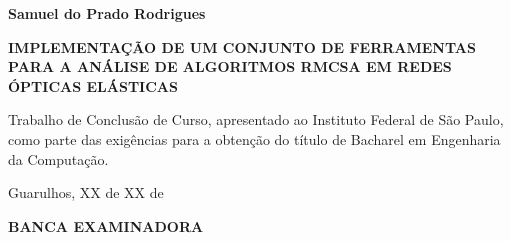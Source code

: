 \begin{center}

\textbf{Samuel do Prado Rodrigues}

\vfill

\textbf{\MakeUppercase{Implementação de um conjunto de ferramentas para a análise de algoritmos RMCSA em redes ópticas elásticas}}

\vfill

\hspace{\fill}
\begin{minipage}{.4 \linewidth}
Trabalho de Conclusão de Curso, apresentado ao Instituto Federal de São Paulo, como parte das exigências para a obtenção do título de Bacharel em Engenharia da Computação.
\end{minipage}

\vfill

Guarulhos, XX de XX de \the\year{}


\vfill

\textbf{BANCA EXAMINADORA}

\vfill


\vfill


\end{center}

